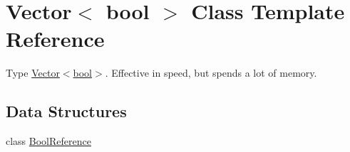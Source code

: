 \hypertarget{classVector_3_01bool_01_4}{}\section{Vector$<$ bool $>$ Class Template Reference}
\label{classVector_3_01bool_01_4}


Type \hyperlink{classVector_3_01bool_01_4}{Vector$<$bool$>$}. Effective in speed, but spends a lot of memory.  


\subsection*{Data Structures}
\begin{DoxyCompactItemize}
\item 
class \hyperlink{classVector_3_01bool_01_4_1_1BoolReference}{Bool\+Reference}
\end{DoxyCompactItemize}
